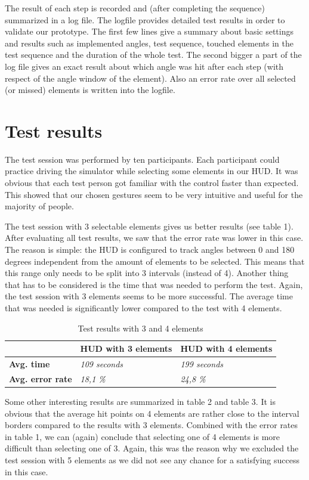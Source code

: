 \documentclass{sigchi-ext}
\begin{document}
The result of each step is recorded and (after completing the sequence) summarized in a log file. The logfile provides detailed test results in order to validate our prototype. The first few lines give a summary about basic settings and results such as implemented angles, test sequence, touched elements in the test sequence and the duration of the whole test. The second bigger a part of the log file gives an exact result about which angle was hit after each step (with respect of the angle window of the element). Also an error rate over all selected (or missed) elements is written into the logfile.

\section{Test results}
The test session was performed by ten participants.  Each participant could practice driving the simulator while selecting some elements in our HUD. It was obvious that each test person got familiar with the control faster than expected. This showed that our chosen gestures seem to be very intuitive and useful for the majority of people.

The test session with 3 selectable elements gives us better results (see table 1). After evaluating all test results, we saw that the error rate was lower in this case. The reason is simple: the HUD is configured to track angles between 0 and 180 degrees independent from the amount of elements to be selected. This means that this range only needs to be split into 3 intervals (instead of 4). Another thing that has to be considered is the time that was needed to perform the test. Again, the test session with 3 elements seems to be more successful. The average time that was needed is significantly lower compared to the test with 4 elements. 

\begin{table}
\begin{tabular}{|l|l|l|}
\hline
  & \textbf{HUD with 3 elements} & \textbf{HUD with 4 elements} \\
\hline
\textbf{Avg. time} & \textit{109 seconds} & \textit{199 seconds} \\
\hline
\textbf{Avg. error rate} & \textit{18,1 \%} & \textit{24,8 \%} \\
\hline
\end{tabular}
\caption{Test results with 3 and 4 elements}
\end{table}

Some other interesting results are summarized in table 2 and table 3. It is obvious that the average hit points on 4 elements are rather close to the interval borders compared to the results with 3 elements. Combined with the error rates in table 1, we can (again) conclude that selecting one of 4 elements is more difficult than selecting one of 3. Again, this was the reason why we excluded the test session with 5 elements as we did not see any chance for a satisfying success in this case.
\end{document}
